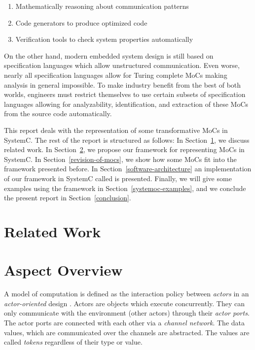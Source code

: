 \begin{enumerate}
\item Mathematically reasoning about communication patterns

\item Code generators to produce optimized code

\item Verification tools to check system properties automatically
\end{enumerate}

On the other hand, modern embedded system design is still based on
specification languages which allow unstructured communication.
Even worse, nearly all specification languages allow for Turing
complete MoCs making analysis in general impossible.
To make industry benefit from the best of both worlds,
engineers must restrict themselves to use certain subsets of
specification languages allowing for analyzability, identification,
and extraction of these MoCs from the source code automatically.

This report deals with the representation of some transformative
MoCs in SystemC. The rest of the report is structured as follows:
In Section~\ref{related-work}, we discuss related work. In
Section~\ref{aspect-overview}, we propose our framework for
representing MoCs in SystemC. In Section~\ref{revision-of-mocs},
we show how some MoCs fit into
the framework presented before. In Section~\ref{software-architecture}
an implementation of our framework in SystemC called \SysteMoC{} is
presented. Finally, we will give some examples using the \SysteMoC{}
framework in Section~\ref{systemoc-examples}, and we conclude
the present report in Section~\ref{conclusion}.

\section{Related Work}\label{related-work}

\section{Aspect Overview}\label{aspect-overview}

A model of computation \cite{embsft:2002} is defined as the 
interaction policy between \emph{actors} in an \emph{actor-oriented} design
\cite{agha97abstracting:1997}.
Actors are objects which execute concurrently. They can only
communicate with the environment (other actors) through their \emph{actor ports}.
The actor ports are connected with each other via a \emph{channel network}.
The data values, which are communicated over the channels
are abstracted. The values are called \emph{tokens} regardless
of their type or value.

